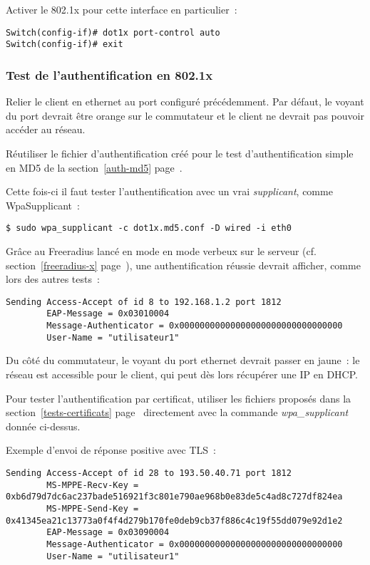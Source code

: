 Activer le 802.1x pour cette interface en particulier~:

\begin{lstlisting}
Switch(config-if)# dot1x port-control auto
Switch(config-if)# exit
\end{lstlisting}

\subsubsection{Test de l'authentification en 802.1x}

Relier le client en ethernet au port configuré précédemment. Par défaut, le voyant du port devrait être orange sur le commutateur et le client ne devrait pas pouvoir accéder au réseau.

Réutiliser le fichier d'authentification créé pour le test d'authentification simple en MD5 de la section~\ref{auth-md5} page~\pageref{auth-md5}.

Cette fois-ci il faut tester l'authentification avec un vrai \emph{supplicant}, comme WpaSupplicant~:

\begin{lstlisting}
$ sudo wpa_supplicant -c dot1x.md5.conf -D wired -i eth0
\end{lstlisting}

Grâce au Freeradius lancé en mode en mode verbeux sur le serveur (cf. section~\ref{freeradius-x} page~\pageref{freeradius-x}), une authentification réussie devrait afficher, comme lors des autres tests~:

\begin{lstlisting}[morekeywords={0x03010004, 8}]
Sending Access-Accept of id 8 to 192.168.1.2 port 1812
        EAP-Message = 0x03010004
        Message-Authenticator = 0x00000000000000000000000000000000
        User-Name = "utilisateur1"
\end{lstlisting}

Du côté du commutateur, le voyant du port ethernet devrait passer en jaune~: le réseau est accessible pour le client, qui peut dès lors récupérer une IP en DHCP.

Pour tester l'authentification par certificat, utiliser les fichiers proposés dans la section~\ref{tests-certificats} page~\pageref{tests-certificats} directement avec la commande \emph{wpa\_supplicant} donnée ci-dessus.

Exemple d'envoi de réponse positive avec TLS~:

\begin{lstlisting}[morekeywords={0xb6d79d7dc6ac237bade516921f3c801e790ae968b0e83de5c4ad8c727df824ea, 0x41345ea21c13773a0f4f4d279b170fe0deb9cb37f886c4c19f55dd079e92d1e2, 0x03090004, 28}]
Sending Access-Accept of id 28 to 193.50.40.71 port 1812
        MS-MPPE-Recv-Key = 0xb6d79d7dc6ac237bade516921f3c801e790ae968b0e83de5c4ad8c727df824ea
        MS-MPPE-Send-Key = 0x41345ea21c13773a0f4f4d279b170fe0deb9cb37f886c4c19f55dd079e92d1e2
        EAP-Message = 0x03090004
        Message-Authenticator = 0x00000000000000000000000000000000
        User-Name = "utilisateur1"
\end{lstlisting}

